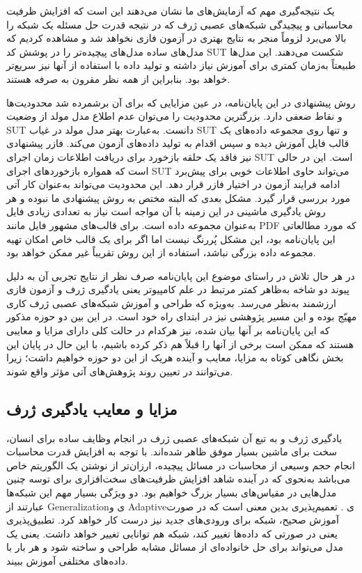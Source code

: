  یک نتیجه‌گیری مهم که آزمایش‌های ما نشان می‌دهند این است که افزایش ظرفیت محاسباتی و پیچیدگی شبکه‌های عصبی ژرف که در نتیجه قدرت حل مسئله یک شبکه را بالا می‌برد لزوماً منجر به نتایج بهتری در آزمون فازی نخواهد شد و مشاهده کردیم که مدل‌های ساده مدل‌های پیچیده‌تر را در پوشش کد \gls{SUT} شکست می‌دهند. این مدل‌ها طبیعتاً به‌زمان کمتری برای آموزش نیاز داشته و تولید داده با استفاده از آنها نیز سریع‌تر خواهد بود. بنابراین از همه نظر مقرون به صرفه هستند.
 
 روش پیشنهادی در این پایان‌نامه، در عین مزایایی که برای آن برشمرده شد محدودیت‌ها و نقاط ضعفی دارد. بزرگترین محدودیت را می‌توان عدم اطلاع مدل مولد از وضعیت \gls{SUT} دانست. به‌عبارت بهتر مدل مولد در غیاب \gls{SUT} و تنها روی مجموعه داده‌های یک قالب فایل آموزش دیده و سپس اقدام به تولید داده‌های آزمون می‌کند. فازر پیشنهادی نیز فاقد یک حلقه بازخورد برای دریافت اطلاعات زمان اجرای \gls{SUT} است. این در حالی است که همواره بازخوردهای اجرای \gls{SUT} می‌تواند حاوی اطلاعات خوبی برای پیش‌برد ادامه فرایند آزمون در اختیار فازر قرار دهد. این محدودیت می‌تواند به‌عنوان کار آتی مورد بررسی قرار گیرد. مشکل بعدی که البته مختص به روش پیشنهادی ما نبوده و هر روش یادگیری ماشینی در این زمینه با آن مواجه است نیاز به تعدادی زیادی فایل به‌عنوان مجموعه داده است. برای قالب‌های مشهور فایل مانند \gls{PDF} که مورد مطالعاتی این‌ پایان‌نامه بود، این مشکل پُررنگ نیست اما اگر برای یک قالب خاص امکان تهیه مجموعه داده بزرگی نباشد، استفاده از این روش تقریباً غیر ممکن خواهد بود. 

در هر حال تلاش در راستای موضوع این پایان‌نامه صرف نظر از نتایج تجربی آن به دلیل پیوند دو شاخه به‌ظاهر کمتر مرتبط در علم کامپیوتر یعنی یادگیری ژرف و آزمون فازی ارزشمند به‌نظر می‌رسد. به‌ویژه که طراحی و آموزش شبکه‌های عصبی ژرف کاری مهیّج بوده و این مسیر پژوهشی نیز در ابتدای راه خود است. در این بین دو حوزه مذکور که این پایان‌نامه بر آنها بیان شده، نیز هرکدام در حالت کلی دارای مزایا و معایبی هستند که ممکن است برخی از آنها را قبلاً هم ذکر کرده باشیم، با این حال در پایان این بخش نگاهی کوتاه به مزایا، معایب و آینده هریک از این دو حوزه خواهیم داشت؛ زیرا می‌توانند در تعیین روند پژوهش‌های آتی مؤثر واقع شوند.



\subsection{مزایا و معایب یادگیری ژرف}
یادگیری ژرف و به تبع آن شبکه‌های عصبی ژرف در انجام وظایف ساده‌ برای انسان، سخت برای ماشین بسیار موفق ظاهر شده‌اند. با توجه به افزایش قدرت محاسبات انجام حجم وسیعی از محاسبات در مسائل پیچیده، ارزان‌تر از نوشتن یک الگوریتم خاص می‌باشد به‌نحوی که در آینده شاهد افزایش ظرفیت‌های سخت‌افزاری برای توسه چنین مدل‌هایی در مقیاس‌های بسیار بزرگ خواهیم بود. دو ویژگی بسیار مهم این شبکه‌ها عبارتند از \gls{Generalization}ی و \gls{Adaptive}ی  \cite{Goodfellow-et-al-2016}. تعمیم‌پذیری بدین معنی است که در صورت آموزش صحیح، شبکه برای ورودی‌های جدید نیز درست کار خواهد کرد. تطبیق‌پذیری یعنی در صورتی که داده‌ها تغییر کند، شبکه هم توانایی تغییر خواهد داشت. یعنی یک مدل می‌تواند برای حل خانواده‌ای از مسائل مشابه طراحی و ساخته شود و هر بار با داده‌های مختلفی آموزش ببیند.

